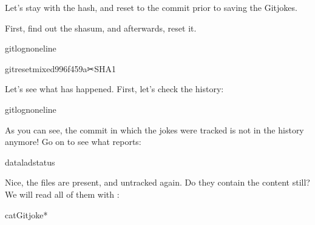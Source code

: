 \sphinxAtStartPar
Let’s stay with the hash, and reset to the commit prior to saving the Gitjokes.

\sphinxAtStartPar
First, find out the shasum, and afterwards, reset it.

\begin{sphinxVerbatim}[commandchars=\\\{\}]
gitlog\PYGZhy{}n\PYGZhy{}\PYGZhy{}oneline
\end{sphinxVerbatim}

\begin{sphinxVerbatim}[commandchars=\\\{\}]
gitreset\PYGZhy{}\PYGZhy{}mixed996f459a✂SHA1
\end{sphinxVerbatim}

\sphinxAtStartPar
Let’s see what has happened. First, let’s check the history:

\begin{sphinxVerbatim}[commandchars=\\\{\}]
gitlog\PYGZhy{}n\PYGZhy{}\PYGZhy{}oneline
\end{sphinxVerbatim}

\sphinxAtStartPar
As you can see, the commit in which the jokes were tracked
is not in the history anymore! Go on to see what 
reports:

\begin{sphinxVerbatim}[commandchars=\\\{\}]
dataladstatus
\end{sphinxVerbatim}

\sphinxAtStartPar
Nice, the files are present, and untracked again. Do they contain
the content still? We will read all of them with :

\begin{sphinxVerbatim}[commandchars=\\\{\}]
catGitjoke*
\end{sphinxVerbatim}

